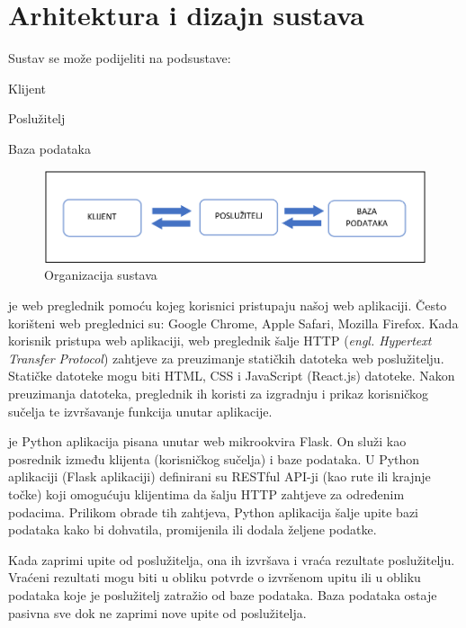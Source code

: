 \chapter{Arhitektura i dizajn sustava}		
	
	Sustav se može podijeliti na podsustave:
		\begin{packed_item}
			
			\item  Klijent
			\item  Poslužitelj
			\item  Baza podataka
			
		\end{packed_item}
	
		\begin{figure}[H]
			\includegraphics[width=\textwidth]{slike/Organizacija_sustava.PNG} %
			\caption{Organizacija sustava}
			\label{fig:organizacija_sustava1} %
		\end{figure}
		
 
 je web preglednik pomoću kojeg korisnici pristupaju našoj web aplikaciji. Često korišteni web preglednici su: Google Chrome, Apple Safari, Mozilla Firefox. Kada korisnik pristupa web aplikaciji, web preglednik šalje HTTP (\textit{engl. Hypertext Transfer Protocol}) zahtjeve za preuzimanje statičkih datoteka web poslužitelju. Statičke datoteke mogu biti HTML, CSS i JavaScript (React.js) datoteke. Nakon preuzimanja datoteka, preglednik ih koristi za izgradnju i prikaz korisničkog sučelja te izvršavanje funkcija unutar aplikacije. 

 je Python aplikacija pisana unutar web mikrookvira Flask. On služi kao posrednik između  klijenta (korisničkog sučelja) i baze podataka. U Python aplikaciji (Flask aplikaciji) definirani su RESTful API-ji (kao rute ili krajnje točke) koji omogućuju klijentima da šalju HTTP zahtjeve za određenim podacima. Prilikom obrade tih zahtjeva, Python aplikacija šalje upite bazi podataka kako bi dohvatila, promijenila ili dodala željene podatke.

Kada  zaprimi upite od poslužitelja, ona ih izvršava i vraća rezultate poslužitelju. Vraćeni rezultati mogu biti u obliku potvrde o izvršenom upitu ili u obliku podataka koje je poslužitelj zatražio od baze podataka. Baza podataka ostaje pasivna sve dok ne zaprimi nove upite od poslužitelja.

